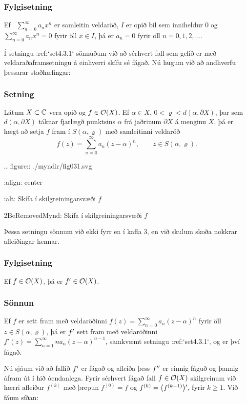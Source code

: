 \subsubsection{Fylgisetning}  Ef \ $\sum_{n=0}^{\infty} a_nx^n$ er samleitin veldaröð,
$I$ er opið bil sem inniheldur $0$ og   $\sum_{n=0}^{\infty}
a_nx^n=0$  fyrir öll $x\in I$, þá er $a_n=0$ fyrir öll $n=0,1,2,\dots$.



Í setningu :ref:`set4.3.1`
sönnuðum við að sérhvert fall sem gefið er með veldaraðaframsetningu á
einhverri skífu sé fágað.  Nú hugum við að andhverfu þessarar
staðhæfingar:

\subsubsection{Setning}
Látum $X\subset {\mathbb C}$ vera opið og $f\in {\cal O}(X)$.  Ef $\alpha\in X$,
$0<\varrho<d(\alpha,\partial X)$, þar sem  $d(\alpha,\partial X)$
táknar fjarlægð punktsins $\alpha$ frá jaðrinum $\partial X$ á
menginu $X$, þá er hægt að setja $f$ fram í $S(\alpha,\varrho)$ með
samleitinni veldaröð  
 $$f(z) = \sum\limits_{n=0}^\infty a_n(z-\alpha)^n, \qquad z\in
S(\alpha,\varrho). 
 $$
 

.. figure:: ./myndir/fig031.svg

    :align: center

    :alt: Skífa í skilgreiningarsvæði $f$

    2BeRemovedMynd: Skífa í skilgreiningarsvæði $f$



Þessa setningu sönnum við ekki fyrr en í kafla 3, en við skulum skoða
nokkrar afleiðingar hennar.  

\subsubsection{Fylgisetning}
Ef $f\in {\cal O}(X)$, þá er $f{\sp{\prime}}\in {\cal O}(X)$.


\subsubsection{Sönnun}
Ef $f$ er sett fram með veldaröðinni 
$f(z)=\sum_{n=0}^\infty a_n(z-\alpha)^n$ fyrir öll $z\in
S(\alpha,\varrho)$,
þá er $f{\sp{\prime}}$ sett fram með veldaröðinni
$f'(z)=\sum_{n=1}^\infty na_n(z-\alpha)^{n-1}$,
samkvæmt setningu :ref:`set4.3.1`, og er því fágað.


\bigskip
Nú sjáum við að fallið $f{\sp{\prime}}$ er fágað og afleiða þess $f{\sp{\prime\prime}}$ er
einnig fáguð og þannig áfram út í hið óendanlega.  Fyrir sérhvert
fágað fall $f\in {\cal O}(X)$ skilgreinum við hærri afleiður $f^{(k)}$ með
þrepun $f^{(0)}=f$ og $f^{(k)}=\big(f^{(k-1)}\big){\sp{\prime}}$, fyrir
$k\geq 1$. Við fáum síðan:


